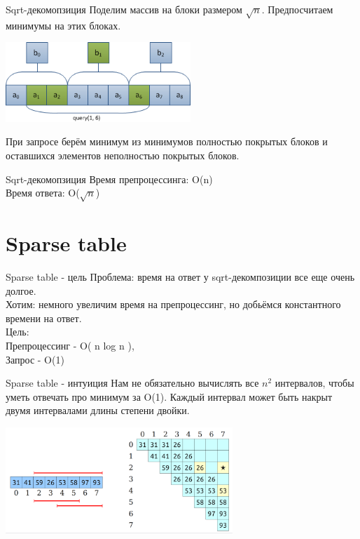 \documentclass[10pt]{beamer}
\begin{document}
\begin{frame}[fragile]{Sqrt-декомопзиция}
Поделим массив на блоки размером $\sqrt{n}$. Предпосчитаем минимумы на этих блоках.
\begin{center}
    \includegraphics[height=3cm]{Term_2/Source/images/rmq-sqrt.png}
\end{center}
При запросе берём минимум из минимумов полностью покрытых блоков и оставшихся элементов неполностью покрытых блоков.
\end{frame}

\begin{frame}[fragile]{Sqrt-декомопзиция}
Время препроцессинга: O(n)\\
Время ответа: O($\sqrt{n}$)\\
\end{frame}

\section{Sparse table}

\begin{frame}[fragile]{Sparse table - цель}
Проблема: время на ответ у sqrt-декомпозиции все еще очень долгое. \\
Хотим: немного увеличим время на препроцессинг, но добьёмся константного времени на ответ. \\
Цель: \\
Препроцессинг - O( n log n ), \\
Запрос - O(1)
\end{frame}

\begin{frame}[fragile]{Sparse table - интуиция}
Нам не обязательно вычислять все $n^2$ интервалов, чтобы уметь отвечать про минимум за O(1). Каждый интервал может быть накрыт двумя интервалами длины степени двойки.\\
\begin{center}
    \includegraphics[height=4cm]{Term_2/Source/images/9-sparse-3.png}
\end{center}
\end{frame}
\end{document}
